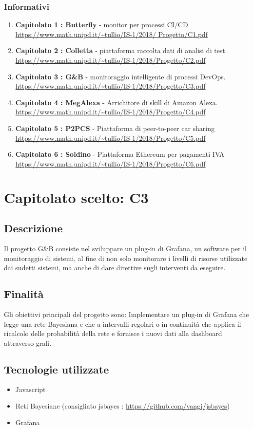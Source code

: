 \documentclass{article}
\begin{document}
		\subsubsection{Informativi}
			\begin{enumerate}
				\item \textbf{Capitolato 1 : Butterfly} - monitor per processi CI/CD \newline 	\url{ https://www.math.unipd.it/~tullio/IS-1/2018/						Progetto/C1.pdf}
				\item \textbf{Capitolato 2 : Colletta} - piattaforma raccolta dati di analisi di test \newline \url{https://www.math.unipd.it/~tullio/IS-1/2018/Progetto/C2.pdf}
				\item \textbf{Capitolato 3 : G\&B} - monitoraggio intelligente di processi DevOps. \newline \url{https://www.math.unipd.it/~tullio/IS-1/2018/Progetto/C3.pdf}
				\item \textbf{Capitolato 4 : MegAlexa} - Arrichitore di skill di Amazon Alexa. \newline \url{https://www.math.unipd.it/~tullio/IS-1/2018/Progetto/C4.pdf}
				\item \textbf{Capitolato 5 : P2PCS} - Piattaforma di peer-to-peer car sharing \newline \url{https://www.math.unipd.it/~tullio/IS-1/2018/Progetto/C5.pdf}
			    \item \textbf{Capitolato 6 : Soldino} - Piattaforma Ethereum per pagamenti IVA \newline \url{https://www.math.unipd.it/~tullio/IS-1/2018/Progetto/C6.pdf}
			\end{enumerate}
			
\newpage
    \section{Capitolato scelto: C3}
        \subsection{Descrizione}
        Il progetto G\&B consiste nel sviluppare un plug-in di Grafana, un software per il monitoraggio di sistemi, al fine di non solo monitorare i livelli di risorse utilizzate dai sudetti sistemi, ma anche di dare direttive sugli interventi da eseguire.
        \subsection{Finalità}
        Gli obiettivi principali del progetto sono: Implementare un plug-in di Grafana che legge una rete Bayesiana e che a intervalli regolari o in continuità che applica il ricalcolo delle probabilità della rete e fornisce i nuovi dati alla dashboard attraverso grafi.
        \subsection{Tecnologie utilizzate}
            \begin{itemize}
                \item Javascript
                \item Reti Bayesiane (consigliato jsbayes : \url{https://github.com/vangj/jsbayes})
                \item Grafana
            \end{itemize}
			
			
\end{document}
